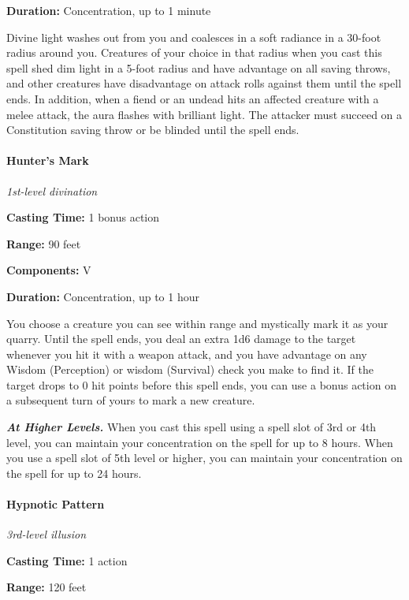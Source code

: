 \documentclass[
]{article}
\begin{document}
\textbf{Duration:} Concentration, up to 1 minute

Divine light washes out from you and coalesces in a soft radiance in a
30-foot radius around you. Creatures of your choice in that radius when
you cast this spell shed dim light in a 5-foot radius and have advantage
on all saving throws, and other creatures have disadvantage on attack
rolls against them until the spell ends. In addition, when a fiend or an
undead hits an affected creature with a melee attack, the aura flashes
with brilliant light. The attacker must succeed on a Constitution saving
throw or be blinded until the spell ends.

\hypertarget{hunters-mark}{%
\paragraph{Hunter's Mark}\label{hunters-mark}}

\emph{1st-level divination}

\textbf{Casting Time:} 1 bonus action

\textbf{Range:} 90 feet

\textbf{Components:} V

\textbf{Duration:} Concentration, up to 1 hour

You choose a creature you can see within range and mystically mark it as
your quarry. Until the spell ends, you deal an extra 1d6 damage to the
target whenever you hit it with a weapon attack, and you have advantage
on any Wisdom (Perception) or wisdom (Survival) check you make to find
it. If the target drops to 0 hit points before this spell ends, you can
use a bonus action on a subsequent turn of yours to mark a new creature.

\emph{\textbf{At Higher Levels.}} When you cast this spell using a spell
slot of 3rd or 4th level, you can maintain your concentration on the
spell for up to 8 hours. When you use a spell slot of 5th level or
higher, you can maintain your concentration on the spell for up to 24
hours.

\hypertarget{hypnotic-pattern}{%
\paragraph{Hypnotic Pattern}\label{hypnotic-pattern}}

\emph{3rd-level illusion}

\textbf{Casting Time:} 1 action

\textbf{Range:} 120 feet
\end{document}
